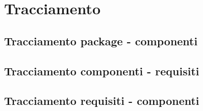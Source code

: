 \section{Tracciamento}

\subsection{Tracciamento package - componenti}
\subsection{Tracciamento componenti - requisiti}
\subsection{Tracciamento requisiti - componenti}
